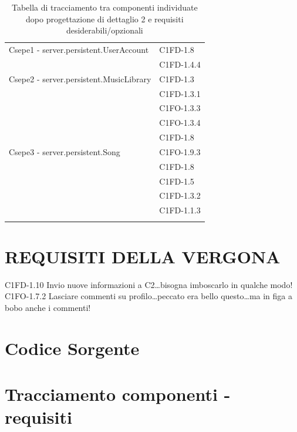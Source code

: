 \begin{footnotesize}
\begin{longtable}[!h]{|l|l|}
Csepe1 - server.persistent.UserAccount & C1FD-1.8 \\
& C1FD-1.4.4 \\\hline
Csepe2 - server.persistent.MusicLibrary & C1FD-1.3 \\
& C1FD-1.3.1 \\
& C1FO-1.3.3 \\
& C1FO-1.3.4 \\
& C1FD-1.8 \\\hline
Csepe3 - server.persistent.Song & C1FO-1.9.3 \\
& C1FD-1.8 \\
& C1FD-1.5 \\
& C1FD-1.3.2 \\
& C1FD-1.1.3 \\\hline
\caption{Tabella di tracciamento tra componenti individuate dopo
progettazione di dettaglio 2 e requisiti desiderabili/opzionali}
\end{longtable}
\end{footnotesize}

\chapter{REQUISITI DELLA VERGONA}
C1FD-1.10 Invio nuove informazioni a C2\ldots bisogna imboscarlo in qualche
modo!\\
C1FO-1.7.2 Lasciare commenti su profilo\ldots peccato era bello questo\ldots ma
in figa a bobo anche i commenti! 



\appendix\chapter{Codice Sorgente}
\thispagestyle{fancy} %

\chapter{Tracciamento componenti - requisiti}
\thispagestyle{fancy} %


\listoftables
{}
\listoffigures
{}

